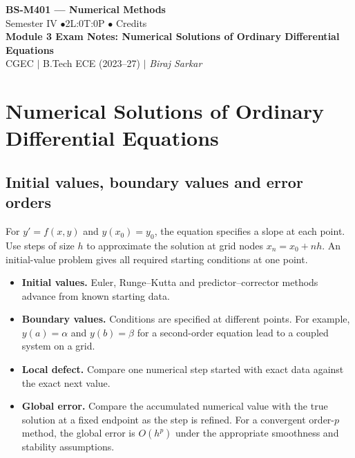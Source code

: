 \documentclass[12pt,a4paper]{article}
\begin{document}
\begin{center}
  {\LARGE\bfseries\color{myred} BS-M401 --- Numerical Methods}\\[5pt]
  {\normalsize\color{mydark} Semester IV \quad$\bullet$\quad 2L:0T:0P \quad$\bullet$ Credits}\\[3pt]
  {\normalsize\color{myteal}\textbf{Module 3 Exam Notes: Numerical Solutions of Ordinary Differential Equations}}\\[3pt]
  {\small\color{mydark} CGEC \;$|$\; B.Tech ECE (2023--27) \;$|$\; \textit{Biraj Sarkar}}
\end{center}
\vspace{2pt}
\noindent{\color{myred}\rule{\linewidth}{1.5pt}}
\vspace{2pt}

\hypersetup{linkcolor=mydark}
\tableofcontents
\hypersetup{linkcolor=myteal}
\newpage

\section{Numerical Solutions of Ordinary Differential Equations}
\subsection{Initial values, boundary values and error orders}
\begin{tcolorbox}[defbox, title={Initial-value problem}]
For $y'=f(x,y)$ and $y(x_0)=y_0$, the equation specifies a slope at each point. Use steps of size $h$ to approximate the solution at grid nodes $x_n=x_0+nh$. An initial-value problem gives all required starting conditions at one point.
\end{tcolorbox}

\begin{itemize}[leftmargin=*, itemsep=3pt, topsep=4pt]
  \item \textbf{Initial values.} Euler, Runge--Kutta and predictor--corrector methods advance from known starting data.
  \item \textbf{Boundary values.} Conditions are specified at different points. For example, $y(a)=\alpha$ and $y(b)=\beta$ for a second-order equation lead to a coupled system on a grid.
  \item \textbf{Local defect.} Compare one numerical step started with exact data against the exact next value.
  \item \textbf{Global error.} Compare the accumulated numerical value with the true solution at a fixed endpoint as the step is refined. For a convergent order-$p$ method, the global error is $O(h^p)$ under the appropriate smoothness and stability assumptions.
\end{itemize}
\end{document}
